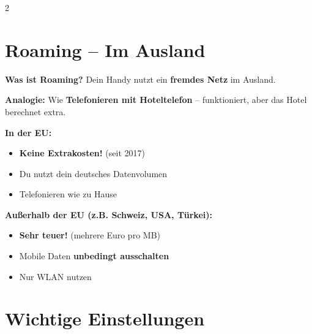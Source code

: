 \documentclass[a4paper,landscape,8pt]{extarticle}
\begin{document}
\begin{multicols}{2}
\columnbreak

\section*{\textcolor{roamingorange}{Roaming -- Im Ausland}}

\textbf{Was ist Roaming?} Dein Handy nutzt ein \textbf{fremdes Netz} im Ausland.

\textbf{Analogie:} Wie \textbf{Telefonieren mit Hoteltelefon} -- funktioniert, aber das Hotel berechnet extra.

\vspace{2mm}

\textbf{In der EU:}
\begin{itemize}
\item \textbf{Keine Extrakosten!} (seit 2017)
\item Du nutzt dein deutsches Datenvolumen
\item Telefonieren wie zu Hause
\end{itemize}

\textbf{Außerhalb der EU (z.B. Schweiz, USA, Türkei):}
\begin{itemize}
\item \textbf{Sehr teuer!} (mehrere Euro pro MB)
\item Mobile Daten \textbf{unbedingt ausschalten}
\item Nur WLAN nutzen
\end{itemize}

\vspace{2mm}

\begin{center}
\end{center}

\vspace{3mm}

\section*{Wichtige Einstellungen}


\end{multicols}
\end{document}
